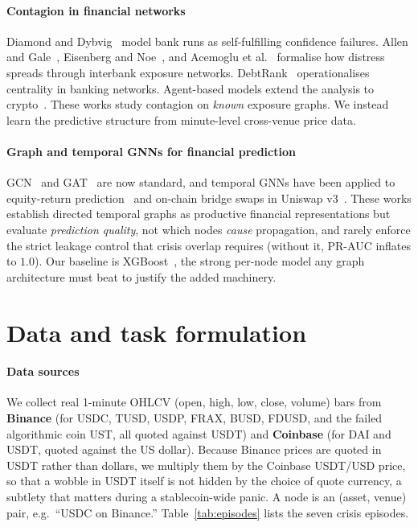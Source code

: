 \documentclass[sigconf,anonymous]{acmart}
\begin{document}
\paragraph{Contagion in financial networks}
Diamond and Dybvig~\cite{diamond1983bank} model bank runs as self-fulfilling confidence failures.
Allen and Gale~\cite{allen2000financial}, Eisenberg and Noe~\cite{eisenberg2001systemic}, and
Acemoglu et al.~\cite{acemoglu2015systemic} formalise how distress spreads through interbank
exposure networks. DebtRank~\cite{battiston2012debtrank} operationalises centrality in banking
networks. Agent-based models extend the analysis to crypto~\cite{gu2024spoofability}. These works
study contagion on \emph{known} exposure graphs. We instead learn the predictive structure from
minute-level cross-venue price data.

\paragraph{Graph and temporal GNNs for financial prediction}
GCN~\cite{kipf2017gcn} and GAT~\cite{velickovic2018gat} are now standard, and temporal GNNs have
been applied to equity-return prediction~\cite{feng2019temporal} and on-chain bridge swaps in
Uniswap v3~\cite{zhou2025bridge}. These works establish directed temporal graphs as productive
financial representations but evaluate \emph{prediction quality}, not which nodes \emph{cause}
propagation, and rarely enforce the strict leakage control that crisis overlap requires (without it,
PR-AUC inflates to $1.0$). Our baseline is XGBoost~\cite{chen2016xgboost}, the strong per-node
model any graph architecture must beat to justify the added machinery.

\section{Data and task formulation}\label{sec:data}
\paragraph{Data sources} We collect real 1-minute OHLCV (open, high, low, close, volume) bars from
\textbf{Binance} (for USDC, TUSD, USDP, FRAX, BUSD, FDUSD, and the failed algorithmic coin UST, all
quoted against USDT) and \textbf{Coinbase} (for DAI and USDT, quoted against the US dollar). Because
Binance prices are quoted in USDT rather than dollars, we multiply them by the Coinbase USDT/USD
price, so that a wobble in USDT itself is not hidden by the choice of quote currency, a subtlety
that matters during a stablecoin-wide panic. A node is an (asset, venue) pair, e.g.\ ``USDC on
Binance.'' Table~\ref{tab:episodes} lists the seven crisis episodes.
\end{document}
